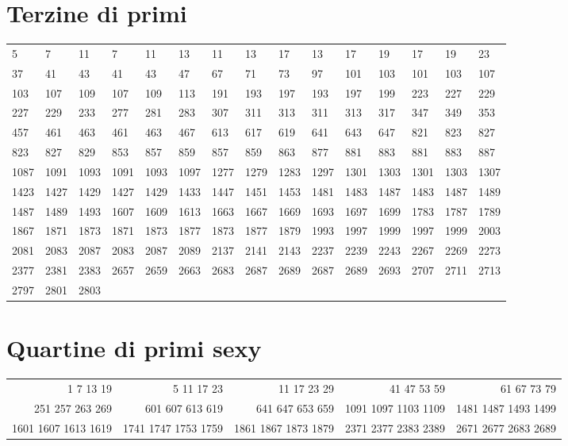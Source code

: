 \section{Terzine di primi}
\begin{center}
\footnotesize
\begin{tabular}{*4{A@{\hspace*{5mm}}A}} 
&7&11&7&11&13&11&13&17&13&17&19&17&19&23\\
37&41&43&41&43&47&67&71&73&97&101&103&101&103&107\\
103&107&109&107&109&113&191&193&197&193&197&199&223&227&229\\
227&229&233&277&281&283&307&311&313&311&313&317&347&349&353\\
457&461&463&461&463&467&613&617&619&641&643&647&821&823&827\\
823&827&829&853&857&859&857&859&863&877&881&883&881&883&887\\
1087&1091&1093&1091&1093&1097&1277&1279&1283&1297&1301&1303&1301&1303&1307\\
1423&1427&1429&1427&1429&1433&1447&1451&1453&1481&1483&1487&1483&1487&1489\\
1487&1489&1493&1607&1609&1613&1663&1667&1669&1693&1697&1699&1783&1787&1789\\
1867&1871&1873&1871&1873&1877&1873&1877&1879&1993&1997&1999&1997&1999&2003\\
2081&2083&2087&2083&2087&2089&2137&2141&2143&2237&2239&2243&2267&2269&2273\\
2377&2381&2383&2657&2659&2663&2683&2687&2689&2687&2689&2693&2707&2711&2713\\
2797&2801&2803\\ 
\bottomrule
\end{tabular}
\end{center}
\section{Quartine di primi sexy}
\begin{center}
	\footnotesize
	\begin{tabular}{*{5}{r}}
		\toprule 
		1 7 13 19&5 11 17 23&11 17 23 29&41 47 53 59&61 67 73 79\\
		251 257 263 269&601 607 613 619&641 647 653 659&1091 1097 1103 1109&1481 1487 1493 1499\\
		1601 1607 1613 1619&1741 1747 1753 1759&1861 1867 1873 1879&2371 2377 2383 2389&2671 2677 2683 2689\\ 
		\bottomrule
	\end{tabular}
\end{center}

